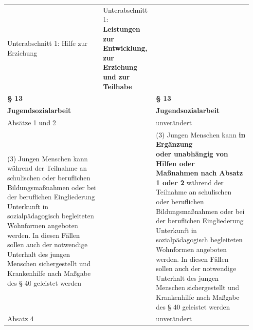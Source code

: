 \documentclass[10pt,a4paper,landscape]{article}
\begin{document}
\begin{longtable}{|L{8.2cm}|L{8.2cm}|L{8.2cm}|}
\hhline{|---|}
Unterabschnitt 1:   \newline Hilfe zur Erziehung & Unterabschnitt 1:\textbf{\textcolor{diffred}{   \newline Leistungen zur Entwicklung, zur  \newline Erziehung und zur Teilhabe  }} &  \\
\hhline{|---|}
\textbf{\S{} 13} &  & \textbf{\S{} 13} \\
\hhline{|---|}
\textbf{Jugendsozialarbeit} &  & \textbf{Jugendsozialarbeit} \\
\hhline{|---|}
Absätze 1 und 2 &  & unverändert \\
\hhline{|---|}
(3) Jungen Menschen kann während der  \newline Teilnahme an schulischen oder beruflichen  \newline Bildungsmaßnahmen oder bei der  \newline beruflichen Eingliederung Unterkunft in  \newline sozialpädagogisch begleiteten  \newline Wohnformen angeboten werden. In diesen  \newline Fällen sollen auch der notwendige  \newline Unterhalt des jungen Menschen  \newline sichergestellt und Krankenhilfe nach  \newline Maßgabe des \S{} 40 geleistet werden &  & (3) Jungen Menschen kann \textbf{\textcolor{diffgreen}{in Ergänzung  \newline oder unabhängig von Hilfen oder  \newline Maßnahmen nach Absatz 1 oder 2}} während der Teilnahme an schulischen  \newline oder beruflichen Bildungsmaßnahmen oder  \newline bei der beruflichen Eingliederung  \newline Unterkunft in sozialpädagogisch  \newline begleiteten Wohnformen angeboten  \newline werden. In diesen Fällen sollen auch der  \newline notwendige Unterhalt des jungen  \newline Menschen sichergestellt und Krankenhilfe  \newline nach Maßgabe des \S{} 40 geleistet werden \\
\hhline{|---|}
Absatz 4 &  & unverändert \\

\end{longtable}
\end{document}
